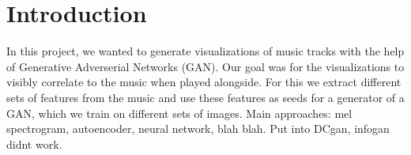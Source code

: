 \chapter{Introduction}
  In this project, we wanted to generate visualizations of music tracks with the help of Generative Adverserial Networks (GAN). Our goal was for the visualizations to visibly correlate to the music when played alongside. For this we extract different sets of features from the music and use these features as seeds for a generator of a GAN, which we train on different sets of images. Main approaches: mel spectrogram, autoencoder, neural network, blah blah. Put into DCgan, infogan didnt work.